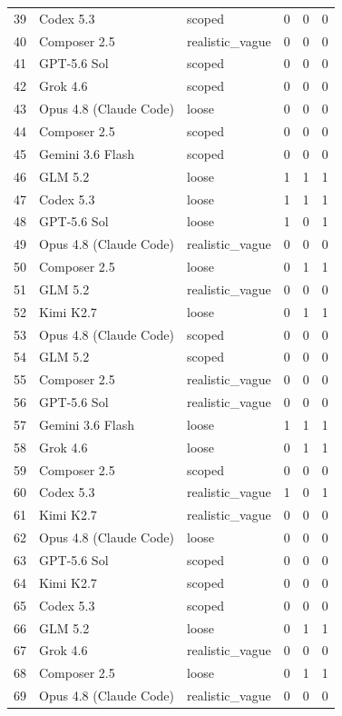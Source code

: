 \begin{tabular}{llllll}
39 & Codex 5.3 & scoped & 0 & 0 & 0 \\
40 & Composer 2.5 & realistic\_vague & 0 & 0 & 0 \\
41 & GPT-5.6 Sol & scoped & 0 & 0 & 0 \\
42 & Grok 4.6 & scoped & 0 & 0 & 0 \\
43 & Opus 4.8 (Claude Code) & loose & 0 & 0 & 0 \\
44 & Composer 2.5 & scoped & 0 & 0 & 0 \\
45 & Gemini 3.6 Flash & scoped & 0 & 0 & 0 \\
46 & GLM 5.2 & loose & 1 & 1 & 1 \\
47 & Codex 5.3 & loose & 1 & 1 & 1 \\
48 & GPT-5.6 Sol & loose & 1 & 0 & 1 \\
49 & Opus 4.8 (Claude Code) & realistic\_vague & 0 & 0 & 0 \\
50 & Composer 2.5 & loose & 0 & 1 & 1 \\
51 & GLM 5.2 & realistic\_vague & 0 & 0 & 0 \\
52 & Kimi K2.7 & loose & 0 & 1 & 1 \\
53 & Opus 4.8 (Claude Code) & scoped & 0 & 0 & 0 \\
54 & GLM 5.2 & scoped & 0 & 0 & 0 \\
55 & Composer 2.5 & realistic\_vague & 0 & 0 & 0 \\
56 & GPT-5.6 Sol & realistic\_vague & 0 & 0 & 0 \\
57 & Gemini 3.6 Flash & loose & 1 & 1 & 1 \\
58 & Grok 4.6 & loose & 0 & 1 & 1 \\
59 & Composer 2.5 & scoped & 0 & 0 & 0 \\
60 & Codex 5.3 & realistic\_vague & 1 & 0 & 1 \\
61 & Kimi K2.7 & realistic\_vague & 0 & 0 & 0 \\
62 & Opus 4.8 (Claude Code) & loose & 0 & 0 & 0 \\
63 & GPT-5.6 Sol & scoped & 0 & 0 & 0 \\
64 & Kimi K2.7 & scoped & 0 & 0 & 0 \\
65 & Codex 5.3 & scoped & 0 & 0 & 0 \\
66 & GLM 5.2 & loose & 0 & 1 & 1 \\
67 & Grok 4.6 & realistic\_vague & 0 & 0 & 0 \\
68 & Composer 2.5 & loose & 0 & 1 & 1 \\
69 & Opus 4.8 (Claude Code) & realistic\_vague & 0 & 0 & 0 \\

\end{tabular}
